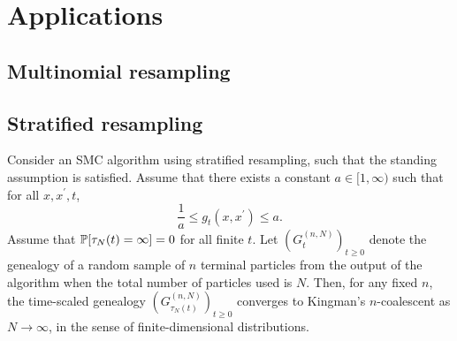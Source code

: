 \chapter{Applications}


\section{Multinomial resampling}



\section{Stratified resampling}

\begin{corollary}\label{thm:stratified}
Consider an SMC algorithm using stratified resampling, such that the standing assumption is satisfied.
Assume that there exists a constant $a\in [1,\infty)$ such that for all $x, x^\prime, t$,
\begin{equation}\label{eq:gq_bounds_sr}
\frac{1}{a} \leq g_t(x, x^\prime) \leq a .
\end{equation}
Assume that $\mathbb{P}[ \tau_N(t) = \infty] =0$ for all finite $t$.
Let $(G_t^{(n,N)})_{t\geq0}$ denote the genealogy of a random sample of $n$ terminal particles from the output of the algorithm when the total number of particles used is $N$. Then, for any fixed $n$, the time-scaled genealogy $(G_{\tau_N(t)}^{(n,N)})_{t\geq0}$ converges to Kingman's $n$-coalescent as $N\to \infty$, in the sense of finite-dimensional distributions.
\end{corollary}

